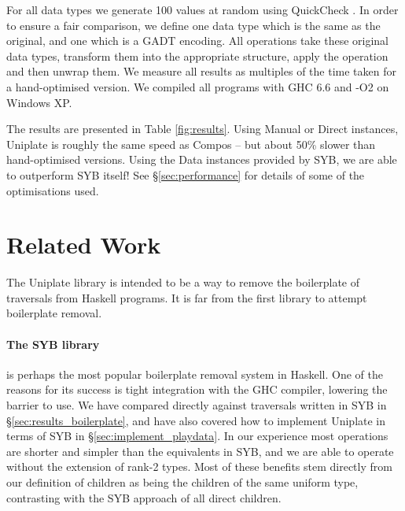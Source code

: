For all data types we generate 100 values at random using QuickCheck \citep{quickcheck}. In order to ensure a fair comparison, we define one data type which is the same as the original, and one which is a GADT encoding. All operations take these original data types, transform them into the appropriate structure, apply the operation and then unwrap them. We measure all results as multiples of the time taken for a hand-optimised version. We compiled all programs with GHC 6.6 and -O2 on Windows XP.

\begin{comment}
\begin{figure}
\texttt{[image: graph.ps]}
\caption{Timing results, relative to Raw.}
\label{fig:graph}
\end{figure}
\end{comment}

The results are presented in Table \ref{fig:results}. Using Manual or Direct instances, Uniplate is roughly the same speed as Compos -- but about 50\% slower than hand-optimised versions. Using the Data instances provided by SYB, we are able to outperform SYB itself! See \S\ref{sec:performance} for details of some of the optimisations used.


\section{Related Work}
\label{sec:related}

The Uniplate library is intended to be a way to remove the boilerplate of traversals from Haskell programs. It is far from the first library to attempt boilerplate removal.

\paragraph{The SYB library} \citep{lammel:syb} is perhaps the most popular boilerplate removal system in Haskell. One of the reasons for its success is tight integration with the GHC compiler, lowering the barrier to use. We have compared directly against traversals written in SYB in \S\ref{sec:results_boilerplate}, and have also covered how to implement Uniplate in terms of SYB in \S\ref{sec:implement_playdata}. In our experience most operations are shorter and simpler than the equivalents in SYB, and we are able to operate without the extension of rank-2 types. Most of these benefits stem directly from our definition of children as being the children of the same uniform type, contrasting with the SYB approach of all direct children.

